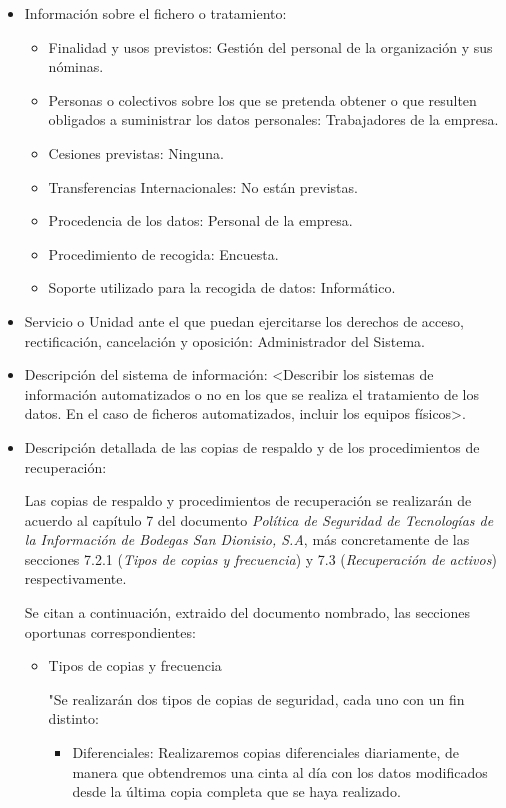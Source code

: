 \documentclass[a4paper,11pt,bibtotoc,noliststotoc]{scrbook}
\begin{document}
\begin{itemize}
\item Información sobre el fichero o tratamiento:
	\begin{itemize}
	\item Finalidad y usos previstos: Gestión del personal de la organización y sus nóminas.
	\item Personas o colectivos sobre los que se pretenda obtener o que resulten obligados a suministrar los datos personales: Trabajadores de la empresa.
	\item Cesiones previstas: Ninguna.
	\item Transferencias Internacionales: No están previstas.
	\item Procedencia de los datos: Personal de la empresa.
	\item Procedimiento de recogida: Encuesta.
	\item Soporte utilizado para la recogida de datos: Informático.
	\end{itemize}

\item Servicio o Unidad ante el que puedan ejercitarse los derechos de acceso, rectificación, cancelación y oposición: Administrador del Sistema.

\item Descripción del sistema de información: <Describir los sistemas de información automatizados o no en los que se realiza el tratamiento de los datos. En el caso de ficheros automatizados, incluir los equipos físicos>.

\item Descripción detallada de las copias de respaldo y de los procedimientos de recuperación:

Las copias de respaldo y procedimientos de recuperación se realizarán de acuerdo al capítulo 7 del documento \emph{Política de Seguridad de Tecnologías de la Información de Bodegas San Dionisio, S.A}, más concretamente de las secciones 7.2.1 (\emph{Tipos de copias y frecuencia}) y 7.3 (\emph{Recuperación de activos}) respectivamente. 

Se citan a continuación, extraido del documento nombrado, las secciones oportunas correspondientes:

\begin{itemize}
\item Tipos de copias y frecuencia

"Se realizarán dos tipos de copias de seguridad, cada uno con un fin distinto: 

\begin{itemize}
\item Diferenciales: Realizaremos copias diferenciales diariamente, de manera que obtendremos una cinta al día con los datos modificados desde la última copia completa que se haya realizado. 


\end{itemize}
\end{itemize}
\end{itemize}
\end{document}
